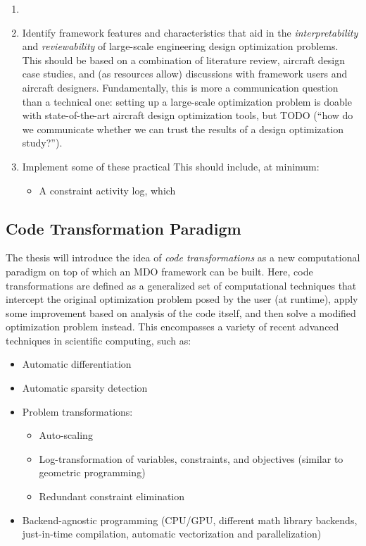 \documentclass[12pt,vi,oneside]{report}
\begin{document}
\begin{enumerate}
\begin{enumerate}
        \end{enumerate}
        \item
        \item Identify framework features and characteristics that aid in the \textit{interpretability} and \textit{reviewability} of large-scale engineering design optimization problems. This should be based on a combination of literature review, aircraft design case studies, and (as resources allow) discussions with framework users and aircraft designers. Fundamentally, this is more a communication question than a technical one: setting up a large-scale optimization problem is doable with state-of-the-art aircraft design optimization tools, but TODO (``how do we communicate whether we can trust the results of a design optimization study?'').
        \item Implement some of these practical This should include, at minimum:
        \begin{itemize}
            \item A constraint activity log, which
        \end{itemize}
    \end{enumerate}


    \subsection{Code Transformation Paradigm}

    The thesis will introduce the idea of \textit{code transformations} as a new computational paradigm on top of which an MDO framework can be built. Here, code transformations are defined as a generalized set of computational techniques that intercept the original optimization problem posed by the user (at runtime), apply some improvement based on analysis of the code itself, and then solve a modified optimization problem instead. This encompasses a variety of recent advanced techniques in scientific computing, such as:
    \begin{itemize}[noitemsep]
        \item Automatic differentiation \cite{griewank_automatic_1988}
        \item Automatic sparsity detection \cite{gebremedhin_efficient_2009}
        \item Problem transformations:
        \begin{itemize}[noitemsep]
            \item Auto-scaling \cite{nocedal_numerical_2006}
            \item Log-transformation of variables, constraints, and objectives (similar to geometric programming) \cite{kirschen, agrawal_disciplined_2019}
            \item Redundant constraint elimination
        \end{itemize}
        \item Backend-agnostic programming (CPU/GPU, different math library backends, just-in-time compilation, automatic vectorization and parallelization) \cite{jax}
    \end{itemize}
\end{document}
